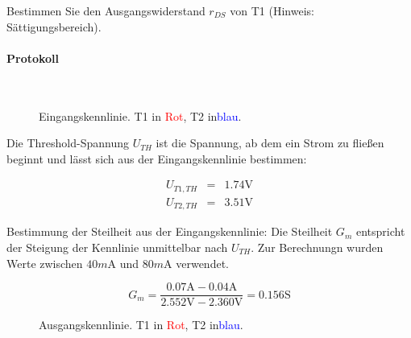 \documentclass[10pt]{scrreprt}
\begin{document}
    Bestimmen Sie den Ausgangswiderstand $r_{DS}$ von T1 (Hinweis: Sättigungsbereich).

    \paragraph{Protokoll}
    $ $

    \begin{figure}[H]
        \centering
        \caption{Eingangskennlinie. T1 in \textcolor{red}{Rot}, T2 in\textcolor{blue}{blau}.}
    \end{figure}

    Die Threshold-Spannung $U_{TH}$ ist die Spannung, ab dem ein Strom zu fließen
    beginnt und lässt sich aus der Eingangskennlinie bestimmen:

    \begin{eqnarray*}
        U_{T1,TH} &=& 1.74 \si{\volt}\\
        U_{T2,TH} &=& 3.51 \si{\volt}
    \end{eqnarray*}

    Bestimmung der Steilheit aus der Eingangskennlinie: Die Steilheit $G_m$
    entspricht der Steigung der Kennlinie unmittelbar nach $U_{TH}$. Zur Berechnungn wurden Werte zwischen
    $40\si{m\ampere}$ und $80\si{m\ampere}$ verwendet.

    \begin{equation*}
        G_m = \frac{0.07\si{\ampere} - 0.04\si{\ampere}}{2.552\si{\volt} - 2.360\si{\volt}} = 0.156\si{\siemens}
    \end{equation*}

    \begin{figure}[H]
        \centering
        \caption{Ausgangskennlinie. T1 in \textcolor{red}{Rot}, T2 in\textcolor{blue}{blau}.}
    \end{figure}
\end{document}
